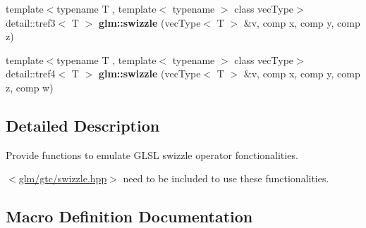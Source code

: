\begin{DoxyCompactItemize}
\item 
\hypertarget{group__gtc__swizzle_ga93106a77480696f43f6f16653cdab940}{}{\footnotesize template$<$typename T , template$<$ typename $>$ class vec\+Type$>$ }\\detail\+::tref3$<$ T $>$ {\bfseries glm\+::swizzle} (vec\+Type$<$ T $>$ \&v, comp x, comp y, comp z)\label{group__gtc__swizzle_ga93106a77480696f43f6f16653cdab940}

\item 
\hypertarget{group__gtc__swizzle_gab79abf7b57f5482982bc87bfa924920a}{}{\footnotesize template$<$typename T , template$<$ typename $>$ class vec\+Type$>$ }\\detail\+::tref4$<$ T $>$ {\bfseries glm\+::swizzle} (vec\+Type$<$ T $>$ \&v, comp x, comp y, comp z, comp w)\label{group__gtc__swizzle_gab79abf7b57f5482982bc87bfa924920a}

\end{DoxyCompactItemize}


\subsection{Detailed Description}
Provide functions to emulate G\+L\+S\+L swizzle operator fonctionalities. 

$<$\hyperlink{swizzle_8hpp}{glm/gtc/swizzle.\+hpp}$>$ need to be included to use these functionalities. 

\subsection{Macro Definition Documentation}
\hypertarget{group__gtc__swizzle_ga63a97949cf1ea4462eaa08b554ed1012}{}
